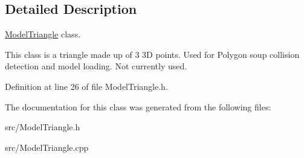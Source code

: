 \subsection{Detailed Description}
\hyperlink{classModelTriangle}{Model\-Triangle} class. 

This class is a triangle made up of 3 3\-D points. Used for Polygon soup collision detection and model loading. Not currently used. 

Definition at line 26 of file Model\-Triangle.\-h.



The documentation for this class was generated from the following files\-:\begin{DoxyCompactItemize}
\item 
src/Model\-Triangle.\-h\item 
src/Model\-Triangle.\-cpp\end{DoxyCompactItemize}
